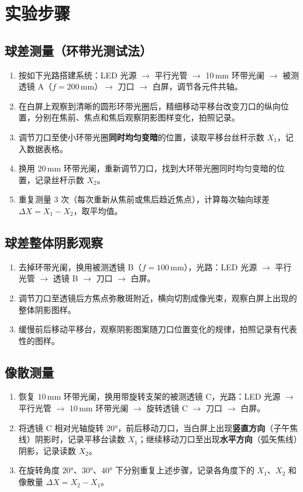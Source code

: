 \documentclass[12pt, a4paper]{article}
\begin{document}
\section{实验步骤}
\subsection{球差测量（环带光测试法）}
\begin{enumerate}
  \item 按如下光路搭建系统：LED 光源 $\to$ 平行光管 $\to$ 10\,mm 环带光阑 $\to$ 被测透镜 A（$f=200$\,mm）$\to$ 刀口 $\to$ 白屏，调节各元件共轴。
  \item 在白屏上观察到清晰的圆形环带光圈后，精细移动平移台改变刀口的纵向位置，分别在焦前、焦点和焦后观察阴影图样变化，拍照记录。
  \item 调节刀口至使小环带光圈\textbf{同时均匀变暗}的位置，读取平移台丝杆示数 $X_1$，记入数据表格。
  \item 换用 20\,mm 环带光阑，重新调节刀口，找到大环带光圈同时均匀变暗的位置，记录丝杆示数 $X_2$。
  \item 重复测量 3 次（每次重新从焦前或焦后趋近焦点），计算每次轴向球差 $\Delta X = X_1 - X_2$，取平均值。
\end{enumerate}

\subsection{球差整体阴影观察}
\begin{enumerate}
  \item 去掉环带光阑，换用被测透镜 B（$f=100$\,mm），光路：LED 光源 $\to$ 平行光管 $\to$ 透镜 B $\to$ 刀口 $\to$ 白屏。
  \item 调节刀口至透镜后方焦点弥散斑附近，横向切割成像光束，观察白屏上出现的整体阴影图样。
  \item 缓慢前后移动平移台，观察阴影图案随刀口位置变化的规律，拍照记录有代表性的图样。
\end{enumerate}

\subsection{像散测量}
\begin{enumerate}
  \item 恢复 10\,mm 环带光阑，换用带旋转支架的被测透镜 C，光路：LED 光源 $\to$ 平行光管 $\to$ 10\,mm 环带光阑 $\to$ 旋转透镜 C $\to$ 刀口 $\to$ 白屏。
  \item 将透镜 C 相对光轴旋转 $20°$，前后移动刀口，当白屏上出现\textbf{竖直方向}（子午焦线）阴影时，记录平移台读数 $X_1$；继续移动刀口至出现\textbf{水平方向}（弧矢焦线）阴影，记录读数 $X_2$。
  \item 在旋转角度 $20°$、$30°$、$40°$ 下分别重复上述步骤，记录各角度下的 $X_1$、$X_2$ 和像散量 $\Delta X = X_2 - X_1$。
\end{enumerate}
\end{document}
